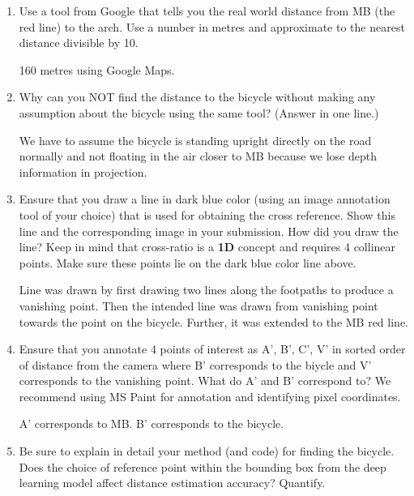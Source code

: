 \begin{enumerate}
\item Use a tool from Google that tells you the real world distance from MB (the red line) to the arch.  Use a number in metres and approximate to the nearest distance divisible by 10. 
\begin{studentSpace}
    \vspace{3cm}
    160 metres using Google Maps.
\end{studentSpace}

\item Why can you NOT find the distance to the bicycle without making any assumption about the bicycle using the same tool? (Answer in one line.)
\begin{studentSpace}
    \vspace{3cm}
    We have to assume the bicycle is standing upright directly on the road normally and not floating in the air closer to MB because we lose depth information in projection.
\end{studentSpace}

\item Ensure that you draw a line in dark blue color (using an image annotation tool of your choice) that is used for obtaining the cross reference.  Show this line and the corresponding image in your submission. How did you draw the line? Keep in mind that cross-ratio is a \textbf{1D} concept and requires 4 collinear points. Make sure these points lie on the dark blue color line above.
\begin{studentSpace}
    \vspace{3cm}
    Line was drawn by first drawing two lines along the footpaths to produce a vanishing point. Then the intended line was drawn from vanishing point towards the point on the bicycle. Further, it was extended to the MB red line.
\end{studentSpace}

\item Ensure that you annotate 4 points of interest as A', B', C', V'  in sorted order of distance from the camera where B' corresponds to the biycle and V' corresponds to the vanishing point.  What do A' and B' correspond to?
We recommend using MS Paint for annotation and identifying pixel coordinates.
\begin{studentSpace}
    \vspace{3cm}
    A' corresponds to MB. B' corresponds to the bicycle.
\end{studentSpace}

\item Be sure to explain in detail your method (and code) for finding the bicycle. Does the choice of reference point within the bounding box from the deep learning model affect distance estimation accuracy? Quantify.
\end{enumerate}
